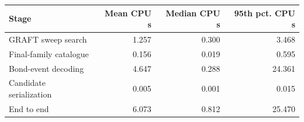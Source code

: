 \begin{tabular}{@{}lrrr@{}}\toprule
Stage & Mean CPU s & Median CPU s & 95th pct. CPU s\\\midrule
GRAFT sweep search & 1.257 & 0.300 & 3.468\\
Final-family catalogue & 0.156 & 0.019 & 0.595\\
Bond-event decoding & 4.647 & 0.288 & 24.361\\
Candidate serialization & 0.005 & 0.001 & 0.015\\
End to end & 6.073 & 0.812 & 25.470\\
\bottomrule\end{tabular}
